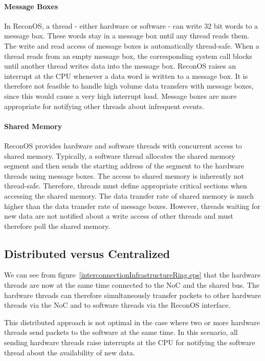 \paragraph{Message Boxes} In ReconOS, a thread - either hardware or software - can write 32 bit words to a message box. These words stay in a message box until any thread reads them. The write and read access of message boxes is automatically thread-safe. When a thread reads from an empty message box, the corresponding system call blocks until another thread writes data into the message box. ReconOS raises an interrupt at the CPU whenever a data word is written to a message box. It is therefore not feasible to handle high volume data transfers with message boxes, since this would cause a very high interrupt load. Message boxes are more appropriate for notifying other threads about infrequent events.
\paragraph{Shared Memory}
ReconOS provides hardware and software threads with concurrent access to shared memory. Typically, a software thread allocates the shared memory segment and then sends the starting address of the segment to the hardware threads using message boxes. The access to shared memory is inherently not thread-safe. Therefore, threads must define appropriate critical sections when accessing the shared memory. The data transfer rate of shared memory is much higher than the data transfer rate of message boxes. However, threads waiting for new data are not notified about a write access of other threads and must therefore poll the shared memory.



\subsection{Distributed versus Centralized}
We can see from figure~\ref{interconnectionInfrastructureRing.eps} that the hardware threads are now at the same time connected to the NoC and the shared bus. The hardware threads can therefore simultaneously transfer packets to other hardware threads via the NoC and to software threads via the ReconOS interface.

This distributed approach is not optimal in the case where two or more hardware threads send packets to the software at the same time. In this scenario, all sending hardware threads raise interrupts at the CPU for notifying the software thread about the availability of new data.

